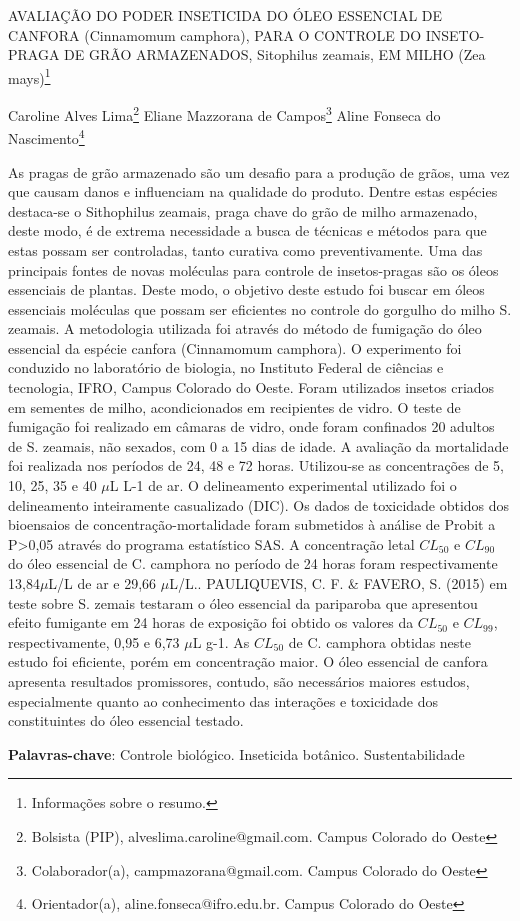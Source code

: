 \documentclass[article,12pt,onesidea,4paper,english,brazil]{abntex2}
\begin{document}
	
	
	\frenchspacing 
	
	\begin{center}
		\LARGE AVALIAÇÃO DO PODER INSETICIDA DO ÓLEO ESSENCIAL DE CANFORA (Cinnamomum camphora), PARA O CONTROLE DO INSETO-PRAGA DE GRÃO ARMAZENADOS, Sitophilus zeamais, EM MILHO (Zea mays)\footnote{Informações sobre o resumo.}
		
		\normalsize
		Caroline Alves Lima\footnote{Bolsista (PIP), alveslima.caroline@gmail.com. Campus Colorado do Oeste} 
		Eliane Mazzorana de Campos\footnote{Colaborador(a), campmazorana@gmail.com. Campus Colorado do Oeste} 
		Aline Fonseca do Nascimento\footnote{Orientador(a), aline.fonseca@ifro.edu.br. Campus Colorado do Oeste} 
		
	\end{center}
	 
	\noindent 
	As pragas de grão armazenado são um desafio para a produção de grãos, uma vez que causam danos e influenciam na qualidade do produto. Dentre estas espécies destaca-se o Sithophilus zeamais, praga chave do grão de milho armazenado, deste modo, é de extrema necessidade a busca de técnicas e métodos para que estas possam ser controladas, tanto curativa como preventivamente. Uma das principais fontes de novas moléculas para controle de insetos-pragas são os óleos essenciais de plantas. Deste modo, o objetivo deste estudo foi buscar em óleos essenciais moléculas que possam ser eficientes no controle do gorgulho do milho S. zeamais. A metodologia utilizada foi através do método de fumigação do óleo essencial da espécie canfora (Cinnamomum camphora). O experimento foi conduzido no laboratório de biologia, no Instituto Federal de ciências e tecnologia, IFRO, Campus Colorado do Oeste. Foram utilizados insetos criados em sementes de milho, acondicionados em recipientes de vidro. O teste de fumigação foi realizado em câmaras de vidro, onde foram confinados 20 adultos de S. zeamais, não sexados, com 0 a 15 dias de idade. A avaliação da mortalidade foi realizada nos períodos de 24, 48 e 72 horas. Utilizou-se as concentrações de 5, 10, 25, 35 e 40 $\mu$L L-1 de ar. O delineamento experimental utilizado foi o delineamento inteiramente casualizado (DIC). Os dados de toxicidade obtidos dos bioensaios de concentração-mortalidade foram submetidos à análise de Probit a P>0,05 através do programa estatístico SAS. A concentração letal $CL_{50}$ e $CL_{90}$ do óleo essencial de C. camphora no período de 24 horas foram respectivamente 13,84$\mu$L/L de ar e 29,66 $\mu$L/L.. PAULIQUEVIS, C. F. \& FAVERO, S. (2015) em teste sobre S. zemais testaram o óleo essencial da pariparoba que apresentou efeito fumigante em 24 horas de exposição foi obtido os valores da $CL_{50}$ e $CL_{99}$, respectivamente, 0,95 e 6,73 $\mu$L g-1. As $CL_{50}$ de C. camphora obtidas neste estudo foi eficiente, porém em concentração maior. O óleo essencial de canfora apresenta resultados promissores, contudo, são necessários maiores estudos, especialmente quanto ao conhecimento das interações e toxicidade dos constituintes do óleo essencial testado.
	\vspace{\onelineskip}
	
	\noindent
	\textbf{Palavras-chave}: Controle biológico. Inseticida botânico. Sustentabilidade
	
\end{document}

